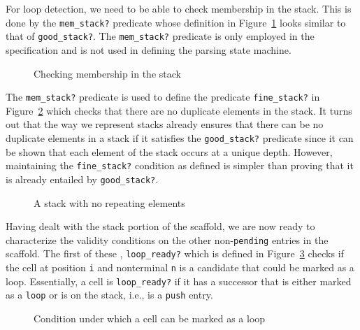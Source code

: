 \documentclass[sigplan,10pt,anonymous,review]{acmart}\settopmatter{printfolios=true,printccs=false,printacmref=false}
\begin{document}
\begin{CCSXML}
For loop detection, we need to be able to check membership in the stack.
This is done by the \texttt{mem\_stack?} predicate whose definition
in Figure~\ref{pvs:memcheck} looks
similar to that of \texttt{good\_stack?}\@.  The \texttt{mem\_stack?} predicate is only employed in the specification and is not used in defining the parsing
state machine.  
                      
\begin{figure}[h!]
  
    \vspace*{-4mm}
			\caption{\small Checking membership in the stack}
			\label{pvs:memcheck}
\end{figure}

The \texttt{mem\_stack?} predicate is used to define the predicate \texttt{fine\_stack?} in Figure~\ref{pvs:finestack}
which checks that there are no duplicate elements in the stack.   It turns out that the way we represent stacks already ensures that there can be no duplicate elements in a stack if it satisfies the \texttt{good\_stack?} predicate since it can be shown that each element of the stack occurs at a unique depth.  However, maintaining the \texttt{fine\_stack?} condition as defined is simpler than proving that 
it is already entailed by \texttt{good\_stack?}.

\begin{figure}[h!]
  
    \vspace*{-4mm}
			\caption{\small A stack with no repeating elements }
			\label{pvs:finestack}
\end{figure}

Having dealt with the stack portion of the scaffold, we are now ready to characterize the validity conditions on the other non-\texttt{pending} entries in the scaffold.
The first of these , \texttt{loop\_ready?} which is defined in Figure~\ref{pvs:loopready} checks if the cell at position \texttt{i} and nonterminal \texttt{n} is a candidate that could be marked as a loop.
Essentially, a cell is \texttt{loop\_ready?} if it has a successor that
is either marked as a \texttt{loop} or is on the stack, i.e., is a \texttt{push} entry.   
\begin{figure}[h!]
  
    \vspace*{-4mm}
\caption{\small \small Condition under which a cell can be marked as a loop}
\label{pvs:loopready}
\end{figure}


\end{CCSXML}
\end{document}
